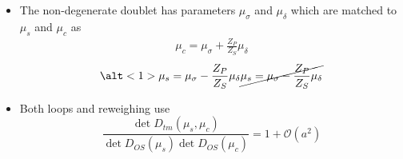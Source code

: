 \documentclass[xcolor={dvipsnames,table}]{beamer}
\begin{document}
\begin{frame}
  \begin{itemize}
    \item The non-degenerate doublet has  parameters $\mu_\sigma$ and $\mu_\delta$ which are matched
          to $\mu_s$ and $\mu_c$ as
          \begin{gather*}
            \mu_c = \mu_\sigma + \frac{Z_P}{Z_S} \mu_\delta 
          \end{gather*}
          \begin{gather*}
           \alt<1>{\mu_s = \mu_\sigma - \frac{Z_P}{Z_S} \mu_\delta }
           {\cancel{ 
            \mu_s = \mu_\sigma - \frac{Z_P}{Z_S} \mu_\delta }
            }
          \end{gather*}
    \item<2-> Both loops and reweighing use
      $$
        \frac{\det{D_{tm}(\mu_s,\mu_c)}}{\det{D_{OS}(\mu_s)\det{D_{OS}(\mu_c)}}} = 1 + \mathcal{O}(a^2)
      $$
  \end{itemize}
\end{frame}
\end{document}
